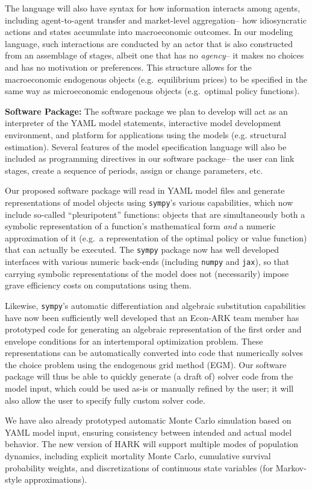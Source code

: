 \documentclass[12pt,pdftex,letterpaper]{article}
\begin{document}
The language will also have syntax for how information interacts among agents, including agent-to-agent transfer and market-level aggregation-- how idiosyncratic actions and states accumulate into macroeconomic outcomes. In our modeling language, such interactions are conducted by an actor that is also constructed from an assemblage of stages, albeit one that has no \textit{agency}-- it makes no choices and has no motivation or preferences. This structure allows for the macroeconomic endogenous objects (e.g.\ equilibrium prices) to be specified in the same way as microeconomic endogenous objects (e.g.\ optimal policy functions).

\vspace{0.5cm}

\noindent \textbf{Software Package:} The software package we plan to develop will act as an interpreter of the YAML model statements, interactive model development environment, and platform for applications using the models (e.g. structural estimation). Several features of the model specification language will also be included as programming directives in our software package-- the user can link stages, create a sequence of periods, assign or change parameters, etc.

Our proposed software package will read in YAML model files and generate representations of model objects using \texttt{sympy}'s various capabilities, which now include so-called ``pleuripotent'' functions: objects that are simultaneously both a symbolic representation of a function's mathematical form \textit{and} a numeric approximation of it (e.g.\ a representation of the optimal policy or value function) that can actually be executed. The \texttt{sympy} package now has well developed interfaces with various numeric back-ends (including \texttt{numpy} and \texttt{jax}), so that carrying symbolic representations of the model does not (necessarily) impose grave efficiency costs on computations using them.

Likewise, \texttt{sympy}'s automatic differentiation and algebraic substitution capabilities have now been sufficiently well developed that an Econ-ARK team member has prototyped code for generating an algebraic representation of the first order and envelope conditions for an intertemporal optimization problem. These representations can be automatically converted into code that numerically solves the choice problem using the endogenous grid method (EGM). Our software package will thus be able to quickly generate (a draft of) solver code from the model input, which could be used as-is or manually refined by the user; it will also allow the user to specify fully custom solver code.

We have also already prototyped automatic Monte Carlo simulation based on YAML model input, ensuring consistency between intended and actual model behavior. The new version of HARK will support multiple modes of population dynamics, including explicit mortality Monte Carlo, cumulative survival probability weights, and discretizations of continuous state variables (for Markov-style approximations).
\end{document}
